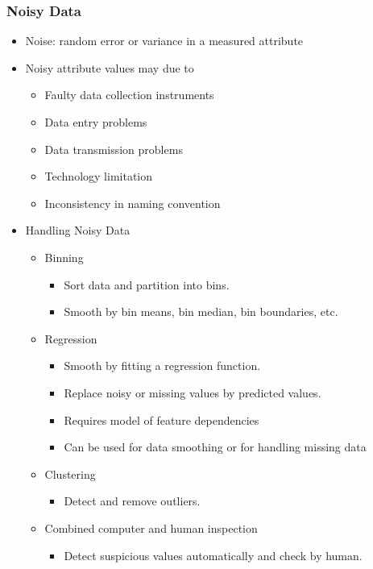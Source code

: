 \documentclass[../notes.tex]{subfiles}
\begin{document}
\subsubsection{Noisy Data}
\begin{itemize}
  \item Noise: random error or variance in a measured attribute

  \item Noisy attribute values may due to
  \begin{itemize}
    \item Faulty data collection instruments
    \item Data entry problems
    \item Data transmission problems
    \item Technology limitation
    \item Inconsistency in naming convention
  \end{itemize}

  \item Handling Noisy Data
  \begin{itemize}
    \item Binning
    \begin{itemize}
      \item Sort data and partition into bins.
      \item Smooth by bin means, bin median, bin boundaries, etc.
    \end{itemize}

    \item Regression
    \begin{itemize}
      \item Smooth by fitting a regression function.
      \item Replace noisy or missing values by predicted values.
      \item Requires model of feature dependencies
      \item Can be used for data smoothing or for handling missing data
    \end{itemize}

    \item Clustering
    \begin{itemize}
      \item Detect and remove outliers.
    \end{itemize}

    \item Combined computer and human inspection
    \begin{itemize}
      \item Detect suspicious values automatically and check by human.
    \end{itemize}

  \end{itemize}  
\end{itemize}
\end{document}
